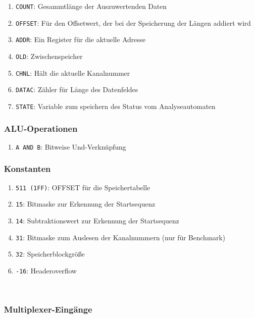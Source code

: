 \documentclass[12pt,titlepage]{article}
\begin{document}
\begin{enumerate}
\item \texttt{COUNT}: Gesammtl{\"a}nge der Auszuwertenden Daten
\item \texttt{OFFSET}: F{\"u}r den Offsetwert, der bei der Speicherung der Längen addiert wird
\item \texttt{ADDR}: Ein Register f{\"u}r die aktuelle Adresse
\item \texttt{OLD}: Zwischenspeicher
\item \texttt{CHNL}: Hält die aktuelle Kanalnummer
\item \texttt{DATAC}: Zähler für Länge des Datenfeldes
\item \texttt{STATE}: Variable zum speichern des Status vom Analyseautomaten
\end{enumerate}

\subsubsection{ALU-Operationen}

\begin{enumerate}
\item \texttt{A AND B}: Bitweise Und-Verknüpfung
\end{enumerate}

\subsubsection{Konstanten}
\begin{enumerate}
\item \texttt{511 (1FF)}: OFFSET für die Speichertabelle
\item \texttt{15}: Bitmaske zur Erkennung der Startsequenz
\item \texttt{14}: Subtraktionswert zur Erkennung der Startsequenz
\item \texttt{31}: Bitmaske zum Auslesen der Kanalnummern (nur für Benchmark)
\item \texttt{32}: Speicherblockgröße
\item \texttt{-16}: Headeroverflow
\end{enumerate}

\leavevmode \\

\subsubsection{Multiplexer-Eingänge}
\end{document}
